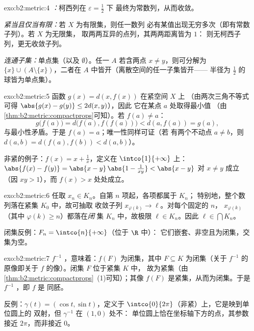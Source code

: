 \begin{solution}{exo:b2:metric:4}
\emph{：}柯西列在 $\varepsilon = \frac12$ 下
最终为常数列，从而收敛。

\emph{紧当且仅当有限：}若 $X$ 为有限集，则任一数列
必有某值出现无穷多次（即有常数子列）。若 $X$ 为无限集，
取两两互异的点列，其两两距离皆为 $1$：
则无柯西子列，更无收敛子列。

\emph{连通子集：}单点集（以及 $\emptyset$）。任一 $A$
若含两点 $x \neq y$，则可分解为 $\{x\} \cup (A
\setminus\{x\})$，二者在 $A$ 中皆开（离散空间的任一子集皆开——
半径为 $\frac12$ 的球皆为单点集）。
\end{solution}

\begin{solution}{exo:b2:metric:5}
函数 $g(x) = d(x, f(x))$ 在紧空间 $X$ 上
（由两次三角不等式可得 $\abs{g(x) - g(y)} \leq 2d(x,y)$），因此
它在某点 $a$ 处取得最小值
（由\cref{thm:b2:metric:compactprops}可知）。若 $f(a) \neq a$：
\[
g\bigl(f(a)\bigr) = d\bigl(f(a), f(f(a))\bigr) < d(a, f(a)) = g(a),
\]
与最小性矛盾。于是 $f(a) = a$；唯一性同样可证（若
有两个不动点 $a \neq b$，则 $d(a,b) = d(f(a), f(b)) < d(a,b)$）。

非紧的例子：$f(x) = x + \frac1x$，定义在 $\intco{1}{+\infty}$ 上：
$\abs{f(x) - f(y)} = \abs{x - y}\,\abs{1 - \frac{1}{xy}} < \abs{x -
y}$ 对 $x \neq y$ 成立（因 $xy > 1$），而 $f(x) > x$ 处处成立。
\end{solution}

\begin{solution}{exo:b2:metric:6}
任取 $x_n \in K_n$。自第 $n$ 项起，各项都属于 $K_n$；
特别地，整个数列落在紧集 $K_0$ 中，故可抽取
收敛子列 $x_{\varphi(k)} \to \ell$。对每个固定的 $n$，
$x_{\varphi(k)}$（其中 $\varphi(k) \geq n$）都落在\emph{闭}
集 $K_n$ 中，故极限 $\ell \in K_n$。因此 $\ell \in \bigcap K_n$。

闭集反例：$F_n = \intco{n}{+\infty}$（位于 $\R$ 中）：
它们嵌套、非空且为闭集，交集为空。
\end{solution}

\begin{solution}{exo:b2:metric:7}
$f^{-1}$ ，意味着：$f(F)$ 为闭集，其中 $F
\subseteq K$ 为闭集（关于 $f^{-1}$ 的原像即关于
$f$ 的像）。闭集 $F$ 位于紧集 $K$ 中，
故为紧集（由\cref{thm:b2:metric:compactprops}~(1)可知）；其像
$f(F)$ 是紧集，从而为闭集。于是 $f^{-1}$ ，即 $f$ 是
同胚。

反例：$\gamma(t) = (\cos t, \sin t)$，定义于
$\intco{0}{2\pi}$（非紧）上，它是映到单位圆上的
双射，但 $\gamma^{-1}$ 在 $(1,0)$ 处不：
单位圆上恰在坐标轴下方的点，其参数接近
$2\pi$，而非接近 $0$。
\end{solution}

